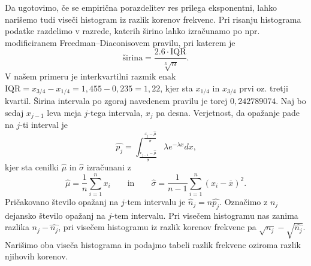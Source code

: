 \documentclass{article}
\begin{document}
Da ugotovimo, če se empirična porazdelitev res prilega eksponentni, lahko narišemo tudi 
viseči histogram iz razlik korenov frekvenc. Pri risanju histograma podatke razdelimo v
razrede, katerih širino lahko izračunamo po npr. modificiranem Freedman--Diaconisovem pravilu, 
pri katerem je $$ \text{širina} = \frac{2.6 \cdot \text{IQR}}{\sqrt[3]{n}}\text{.}$$ V našem primeru je
interkvartilni razmik enak $\text{IQR} = x_{3/4} - x_{1/4} = 1{,}455 - 0{,}235 = 1{,}22$, kjer sta
$x_{1/4}$ in $x_{3/4}$ prvi oz. tretji kvartil.
Širina intervala po zgoraj navedenem pravilu je torej $0{,}242789074$. Naj bo sedaj $x_{j-1}$ 
leva meja $j$-tega intervala, $x_{j}$ pa desna. Verjetnost, da opažanje pade na $j$-ti interval
je 
$$ \hat{p_j} = \int_{\frac{x_{j-1} - \hat{\mu}}{\hat{\sigma}}}^{\frac{x_{j} - \hat{\mu}}{\hat{\sigma}}} \lambda e^{- \lambda x} dx \text{,}$$
kjer sta cenilki $\hat{\mu}$ in $\hat{\sigma}$ izračunani z
$$ \hat{\mu} = \frac{1}{n} \sum_{i=1}^{n} x_i \qquad \text{in} \qquad \hat{\sigma} = \frac{1}{n-1} \sum_{i=1}^{n} \left( x_i - \overline{x} \right)^2 \text{.} $$
Pričakovano število opažanj na $j$-tem intervalu je $\hat{n}_j = n \hat{p_j}$. Označimo z 
$n_j$ dejansko število opažanj na $j$-tem intervalu. Pri visečem histogramu nas zanima razlika
$n_j - \hat{n_j}$, pri visečem histogramu iz razlik korenov frekvenc pa $\sqrt{n_j} - \sqrt{\hat{n_j}}$.
Narišimo oba viseča histograma in podajmo tabeli razlik frekvenc oziroma razlik njihovih korenov.
\end{document}
